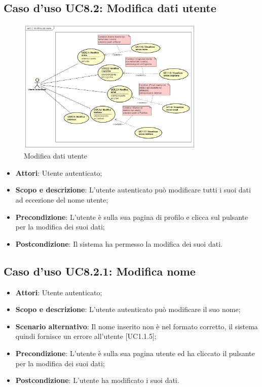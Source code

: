 \documentclass[12pt,a4paper,titlepage]{article}
\begin{document}
	\subsection{Caso d'uso UC8.2: Modifica dati utente}
	\label{UC8.2}
	\begin{figure}[H]
		\centering
		\includegraphics[width=0.8\textwidth]{UseCase/ModificaDatiUtente}
		\caption{Modifica dati utente}
	\end{figure}
	\begin{itemize}
		\item \textbf{Attori}: Utente autenticato;
		\item \textbf{Scopo e descrizione}: L'utente autenticato può modificare tutti i suoi dati ad eccezione del nome utente;
		\item \textbf{Precondizione}: L'utente è sulla sua pagina di profilo e clicca sul pulsante per la modifica dei suoi dati;
		\item \textbf{Postcondizione}: Il sistema ha permesso la modifica dei suoi dati.
	\end{itemize}
	\subsection{Caso d'uso UC8.2.1: Modifica nome}
	\label{UC8.2.1}
	\begin{itemize}
		\item \textbf{Attori}: Utente autenticato;
		\item \textbf{Scopo e descrizione}: L'utente autenticato può modificare il suo nome;
		\item \textbf{Scenario alternativo}: Il nome inserito non è nel formato corretto, il sistema quindi fornisce un errore all'utente [UC1.1.5];
		\item \textbf{Precondizione}: L'utente è sulla sua pagina utente ed ha cliccato il pulsante per la modifica dei suoi dati;
		\item \textbf{Postcondizione}: L'utente ha modificato i suoi dati.
	\end{itemize}
\end{document}
